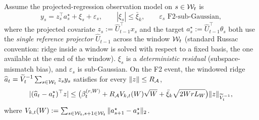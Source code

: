 \begin{lemma}
\label{lem:drift_conf}
Assume the projected-regression observation model on $s\in\mathcal{W}_t$ is
\begin{equation}
y_s = z_s^\top a_s^\star + \xi_s + \varepsilon_s,\qquad
|\xi_s|\le\bar\xi_k,\qquad \varepsilon_s\text{ F2-sub-Gaussian},
\label{eq:ridge_residual_decomp}
\end{equation}
where the projected covariate $z_s:=\widehat U_{t-1}^\top x_s$ and the
target $a_s^\star:=\widehat U_{t-1}^\top\theta_s$ both use the
\emph{single reference projector} $\widehat U_{t-1}$ across the window
$\mathcal{W}_t$ (standard Russac convention: ridge inside a window is solved
with respect to a fixed basis, the one available at the end of the window).
$\xi_s$ is a \emph{deterministic residual} (subspace-mismatch bias), and
$\varepsilon_s$ is sub-Gaussian. On the F2 event, the windowed ridge
$\widehat a_t=\widetilde V_t^{-1}\sum_{s\in\mathcal{W}_t}z_sy_s$ satisfies
for every $\|z\|\le R_{\mathcal{A}}$,
\begin{equation}
|(\widehat a_t-a_t^\star)^\top z|
\le\bigl(\beta_t^{(r,W)}+R_{\mathcal{A}} V_{k,t}(W)\sqrt{W}+\bar\xi_k\sqrt{2WrL_W}\bigr)\|z\|_{\widetilde V_t^{-1}},
\label{eq:drift_lemma_bound}
\end{equation}
where $V_{k,t}(W):=\sum_{s\in\mathcal{W}_t,s+1\in\mathcal{W}_t}\|a_{s+1}^\star-a_s^\star\|_2$.
\end{lemma}
